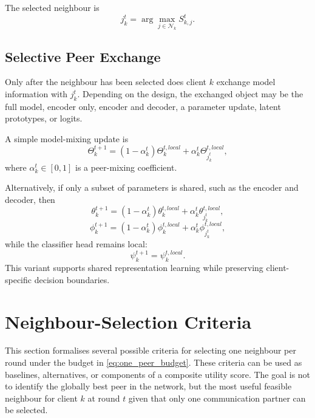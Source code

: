 \documentclass[conference]{IEEEtran}
\begin{document}
The selected neighbour is
\begin{equation}
    j_k^t = \arg\max_{j\in\mathcal{N}_k} S_{k,j}^{t}.
    \label{eq:auto-015}
\end{equation}

\subsection{Selective Peer Exchange}
\label{subsec:selective-peer-exchange}
Only after the neighbour has been selected does client \(k\) exchange model information with \(j_k^t\). Depending on the design, the exchanged object may be the full model, encoder only, encoder and decoder, a parameter update, latent prototypes, or logits.

A simple model-mixing update is
\begin{equation}
    \Theta_k^{t+1}
    =
    (1-\alpha_k^t)\Theta_k^{t,local}
    +
    \alpha_k^t \Theta_{j_k^t}^{t,local},
    \label{eq:model_mixing}
\end{equation}
where \(\alpha_k^t\in[0,1]\) is a peer-mixing coefficient.

Alternatively, if only a subset of parameters is shared, such as the encoder and decoder, then
\begin{equation}
    \theta_k^{t+1}
    =
    (1-\alpha_k^t)\theta_k^{t,local}
    +
    \alpha_k^t \theta_{j_k^t}^{t,local},
    \label{eq:auto-016}
\end{equation}
\begin{equation}
    \phi_k^{t+1}
    =
    (1-\alpha_k^t)\phi_k^{t,local}
    +
    \alpha_k^t \phi_{j_k^t}^{t,local},
    \label{eq:auto-017}
\end{equation}
while the classifier head remains local:
\begin{equation}
    \psi_k^{t+1}=\psi_k^{t,local}.
    \label{eq:auto-018}
\end{equation}
This variant supports shared representation learning while preserving client-specific decision boundaries.

\section{Neighbour-Selection Criteria}
\label{sec:neighbour-selection-criteria}

This section formalises several possible criteria for selecting one neighbour per round under the budget in \eqref{eq:one_peer_budget}. These criteria can be used as baselines, alternatives, or components of a composite utility score. The goal is not to identify the globally best peer in the network, but the most useful feasible neighbour for client $k$ at round $t$ given that only one communication partner can be selected.
\end{document}
